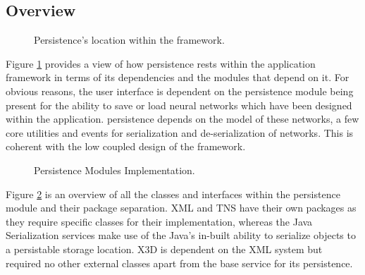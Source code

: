 \documentclass{acm_proc_article-sp}
\begin{document}
\subsection{Overview}
{
\begin{figure}[t]
\centering
{}
\caption{Persistence's location within the framework.}
\label{fig:persistence:depends}
\end{figure}
Figure \ref{fig:persistence:depends} provides a view of how persistence rests within the application
framework in terms of its dependencies and the modules that depend on it. For obvious reasons, the user interface is dependent on the persistence module being present for the ability to save or load neural networks which have been
designed within the application. persistence depends on the model of
these networks, a few core utilities and events for serialization and
de{}-serialization of networks. This is coherent with the low coupled
design of the framework.

\begin{figure}[t]
\centering
{}
\caption{Persistence Modules Implementation.}
\label{fig:persistence:hierarchy}
\end{figure}
Figure \ref{fig:persistence:hierarchy} is an overview of all the classes and interfaces within the persistence module and their package separation. XML and TNS have their own packages as they require specific classes for their implementation, whereas the Java Serialization services make use of the Java's in{}-built ability to serialize objects to a persistable storage location. X3D is dependent on the XML system but required no other external classes apart from the base service for its persistence.
}
\end{document}
